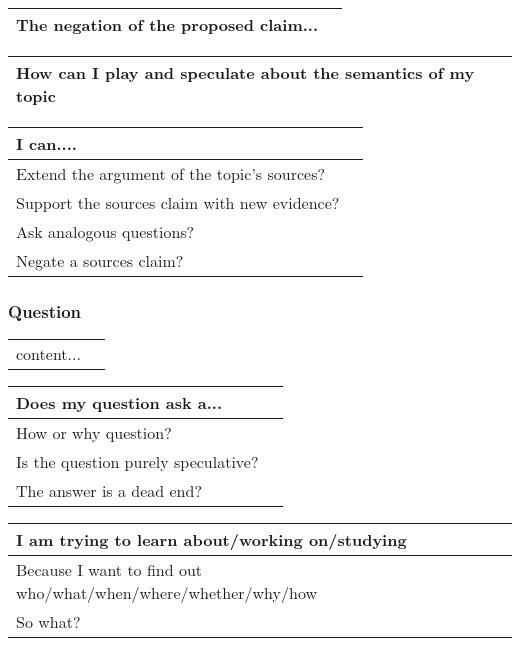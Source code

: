 \documentclass[10pt, a4paper]{article}
\begin{document}
\begin{center}
	\begin{tabular}{|l |l|}
		\hline
		The negation of the proposed claim... &\\
		\hline 
	\end{tabular}
\end{center}

\begin{center}
	\begin{tabular}{|l |l|}
		\hline
		How can I play and speculate about the semantics of my topic &\\
		\hline 
	\end{tabular}
\end{center}
\begin{center}
	\begin{tabular}{|l |l|}
		\hline
		I can.... &\\
		\hline 
		Extend the argument of the topic's sources?&\\
		\hline
		Support the sources claim with new evidence?&\\
		\hline
		Ask analogous questions?&\\
		\hline
		Negate a sources claim?&\\
		\hline
	\end{tabular}
\end{center}
\subsubsection{Question}
\begin{center}
	\begin{tabular}{|l |l|}
		content...
	\end{tabular}
\end{center}

\begin{center}
	\begin{tabular}{|l |l|}
		\hline
		Does my question ask a...&\\
		\hline
		How or why question?&\\
		\hline
		Is the question purely speculative?&\\
		\hline
		The answer is a dead end?&\\
		\hline
	\end{tabular}
\end{center}

\begin{center}
	\begin{tabular}{|l |l|}
		\hline
		I am trying to learn about/working on/studying &\\
		\hline
		Because I want to find out who/what/when/where/whether/why/how&\\
		\hline
		So what?&\\
		\hline
	\end{tabular}
\end{center}
\end{document}
